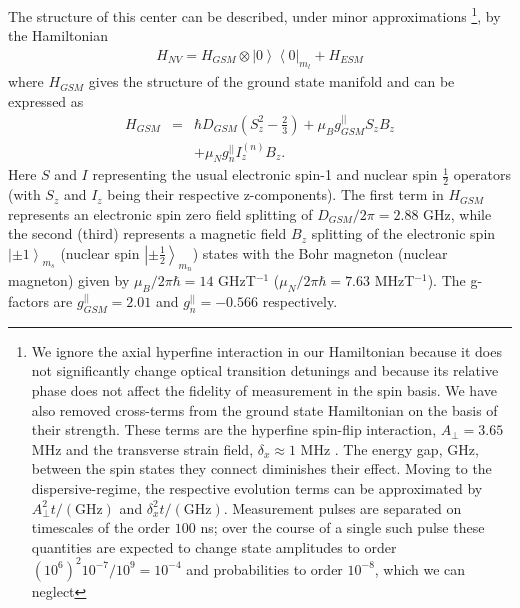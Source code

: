 \documentclass[aps,pra,amsmath,amssymb,reprint,superscriptaddress,tightenlines]{revtex4-1}
\begin{document}
The structure of this center can be described, under minor approximations \footnote{We ignore the axial hyperfine interaction in our Hamiltonian because it does not significantly change optical transition detunings and because its relative phase does not affect the fidelity of measurement in the spin basis. We have also removed cross-terms from the ground state Hamiltonian on the basis of their strength. These terms are the hyperfine spin-flip interaction, $A_{\perp} =3.65$ MHz \cite{Reichart05,Felton09} and the transverse strain field, $\delta_{x} \approx 1$ MHz \cite{Gruber97}. The energy gap, GHz, between the spin states they connect diminishes their effect. Moving to the dispersive-regime, the respective evolution terms can be approximated by $A^{2}_{\perp}t/(\text{GHz})$ and $\delta^{2}_{x}t/(\text{GHz})$. Measurement pulses are separated on timescales of the order $100$ ns; over the course of a single such pulse these quantities are expected to change state amplitudes to order $(10^{6})^{2}10^{-7}/10^{9}=10^{-4}$ and probabilities to order $10^{-8}$, which we can neglect}, by the Hamiltonian \cite{Doherty13}
\begin{align}
H_{NV} = H_{GSM}  \otimes \left|0\right>\left<0\right|_{m_{l}} + H_{ESM} 
\end{align}
where $H_{GSM}$ gives the structure of the ground state manifold and can be expressed as
\begin{eqnarray}
	H_{GSM} &=& \hbar D_{GSM} \left( S^{2}_{z} - \frac{2}{3} \right)+ \mu_{B} g^{||}_{GSM} S_{z} B_{z}\nonumber \\
	&&+ \mu_{N} g^{||}_{n} I^{(n)}_{z} B_{z}.
	\label{eqn:HamGSM}
\end{eqnarray}
Here $S$ and $I$ representing the usual electronic spin-1 and nuclear spin $\frac{1}{2}$ operators (with $S_z$ and $I_z$ being their respective z-components). The first term in $H_{GSM}$ represents an electronic spin zero field splitting of ${D_{GSM}}/{2\pi}=2.88$ GHz, while the second (third) represents a magnetic field $B_z$ splitting of the electronic spin $\left| \pm 1 \right>_{m_{s}}$ (nuclear spin $\left| \pm \frac{1}{2} \right>_{m_{n}}$) states with the Bohr magneton (nuclear magneton) given by ${\mu_{B}}/{2\pi\hbar}=14$ GHzT$^{-1}$ (${\mu_{N}}/{2\pi\hbar}=7.63$ MHzT$^{-1}$). The g-factors are $g^{||}_{GSM}=2.01$ and $g^{||}_{n}=-0.566$ respectively.
\end{document}
